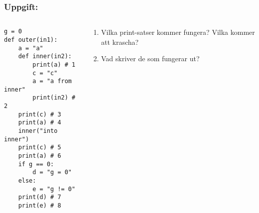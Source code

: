 \documentclass{beamer}
\begin{document}
  \begin{frame}[fragile]
    \frametitle{Uppgift: }
    \begin{columns}
      \begin{column}{0.48\textwidth}
        \begin{verbatim}
g = 0
def outer(in1):
    a = "a"
    def inner(in2):
        print(a) # 1
        c = "c"
        a = "a from inner"
        print(in2) # 2
    print(c) # 3
    print(a) # 4
    inner("into inner")
    print(c) # 5
    print(a) # 6
    if g == 0:
        d = "g = 0"
    else:
        e = "g != 0"
    print(d) # 7
    print(e) # 8
        \end{verbatim}
      \end{column}%
      \begin{column}{0.48\textwidth}
        \begin{enumerate}
          \item Vilka print-satser kommer fungera? Vilka kommer att krascha?
          \item Vad skriver de som fungerar ut?
        \end{enumerate}
      \end{column}%
    \end{columns}
  \end{frame}
\end{document}
